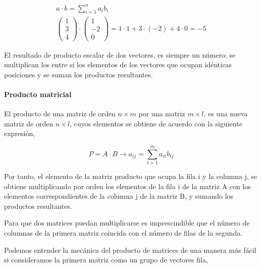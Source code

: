 \begin{gather*}
a\cdot b=\sum_{i=1}^na_ib_i\\
\begin{pmatrix}
1\\
3\\
4
\end{pmatrix}\cdot
\begin{pmatrix}
1\\
-2\\
0
\end{pmatrix}
=1\cdot 1+3 \cdot (-2)+ 4 \cdot 0= -5
\end{gather*}
\begin{paracol}{2}
El resultado de producto escalar de dos vectores, es siempre un número; se multiplican los entre sí los elementos de los vectores que ocupan idénticas posiciones y se suman los productos resultantes. 

\paragraph{Producto matricial}
El producto de una matriz de orden $n\times m$ por una matriz $m\times l$, es una nueva matriz de orden $n\times l$, cuyos elementos se obtiene de acuerdo con la siguiente expresión,    
\end{paracol}


\begin{equation*}
P=A\cdot B \rightarrow a_{ij}=\sum_{t=1}^m a_{it}b_{tj}
\end{equation*}
\begin{paracol}{2}
Por tanto, el elemento de la matriz producto que ocupa la fila i y la columna j, se obtiene multiplicando por orden los elementos de la fila i de la matriz A con los elementos correspondientes de la columna j de la matriz B, y sumando los productos resultantes.

Para que dos matrices puedan multiplicarse es imprescindible que el número de columnas de la primera matriz coincida con el número de filas de la segunda.

Podemos entender la mecánica del producto de matrices de una manera más fácil si consideramos  la primera matriz como un grupo de vectores fila,
\end{paracol}

